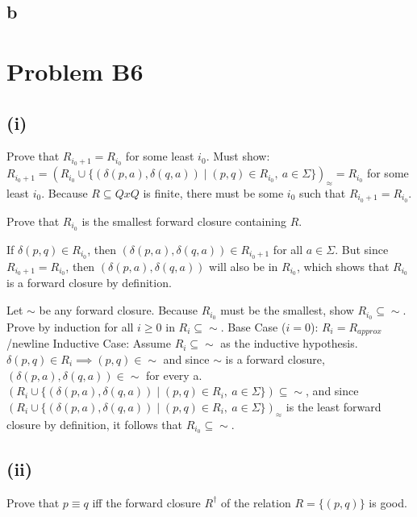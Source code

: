 \documentclass[12pt]{article}
\begin{document}
\subsection*{b}

\section*{Problem B6}

\subsection*{(i)}
Prove that $R_{i_{0}+1} = R_{i_{0}}$ for some least $i_0$.\newline
Must show: $R_{i_{0} + 1} = (R_{i_{0}} \cup 
\{(\delta(p, a), \delta(q, a)) \mid (p, q)\in R_{i_{0}},\ a\in \Sigma\})_{\approx} 
= R_{i_{0}}$ for some least $i_0$.\newline
Because $R \subseteq QxQ$ is finite, there must be some $i_0$ such that 
$R_{i_0+1} = R_{i_0}$.

\medskip

Prove that $R_{i_{0}}$ is the smallest forward closure
containing $R$.

\medskip

If $\delta(p, q) \in R_{i_{0}}$, then $(\delta(p, a), \delta(q, a)) \in 
R_{i_{0}+1}$ for all $a \in \Sigma$. But since $R_{i_{0}+1}=R_{i_{0}}$, then 
$(\delta(p, a), \delta(q, a))$ will also be in $R_{i_{0}}$, which shows that
$R_{i_{0}}$ is a forward closure by definition.

\medskip

Let $\sim$ be any forward closure. Because $R_{i_{0}}$ must be the smallest, 
show $R_{i_{0}} \subseteq \sim$. \newline
Prove by induction for all $i \ge 0$ in $R_i \subseteq \sim$. \newline
Base Case ($i=0$): $R_i = R_{approx}$ /newline
Inductive Case: Assume $R_i \subseteq \sim$ as the inductive hypothesis.
$\delta(p, q) \in R_i \implies (p,q) \in \sim$ and since $\sim$ is a forward
closure, $(\delta(p, a),\delta(q, a)) \in \sim$ for every a. 
$(R_{i} \cup 
\{(\delta(p, a), \delta(q, a)) \mid (p, q)\in R_{i},\ a\in \Sigma\}) \subseteq
\sim$, and since $(R_{i} \cup                    
\{(\delta(p, a), \delta(q, a)) \mid (p, q)\in R_{i},\ a\in \Sigma\})_{\approx}$
is the least forward closure by definition, it follows that $R_{i_{0}} \subseteq \sim$.

\subsection*{(ii)}
Prove that $p\equiv q$ iff the forward closure $R^{\dagger}$ of the
relation $R = \{(p, q)\}$ is good.
\end{document}
